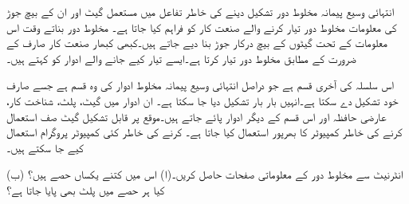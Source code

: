 انتہائی وسیع پیمانہ مخلوط دور تشکیل دینے کی خاطر تفاعل میں مستعمل گیٹ اور ان کے بیچ جوڑ کی معلومات مخلوط دور تیار کرنے والے صنعت کار کو فراہم کیا جاتا ہے۔ مخلوط دور بناتے وقت اس معلومات کے تحت گیٹوں کے بیچ درکار جوڑ بنا دیے جاتے ہیں۔کبھی کبھار صنعت کار صارف کے ضرورت کے مطابق مخلوط دور تیار کرتا ہے۔ایسے تیار کیے جانے والے ادوار کو کہتے ہیں۔

اس سلسلہ کی آخری قسم  ہے جو دراصل انتہائی وسیع پیمانہ مخلوط ادوار کی وہ قسم ہے جسے صارف خود تشکیل دے سکتا ہے۔انہیں بار بار تشکیل دیا جا سکتا ہے۔ ان ادوار میں گیٹ، پلٹ، شناخت کار، عارضی حافظہ اور اس قسم کے دیگر ادوار پائے جاتے ہیں۔موقع پر قابل تشکیل گیٹ صف استعمال کرنے کی خاطر کمپیوٹر کا بھرپور استعمال کیا جاتا ہے۔  کرنے کی خاطر کئی کمپیوٹر پروگرام استعمال کیے جا سکتے ہیں۔ 

انٹرنیٹ سے  مخلوط دور کے معلوماتی صفحات حاصل کریں۔(ا) اس میں کتنے یکساں حصے ہیں؟ (ب) کیا ہر حصے میں پلٹ بھی پایا جاتا ہے؟
